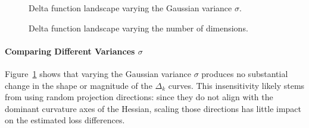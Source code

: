 \documentclass{article}
\begin{document}
\begin{figure}[!htbp]
  \hspace*{-2.6cm}
  \caption{Delta function landscape varying the Gaussian variance $\sigma$.}
  \label{fig:delta_random_sigma}
\end{figure}

\begin{figure}[!htbp]
  \hspace*{-2.6cm}
  \caption{Delta function landscape varying the number of dimensions.}
  \label{fig:delta_random_dim}
\end{figure}

\paragraph{Comparing Different Variances \texorpdfstring{$\sigma$}{sigma}}
Figure~\ref{fig:delta_random_sigma} shows that varying the Gaussian variance $\sigma$ produces no substantial change in the shape or
magnitude of the $\Delta_k$ curves. This insensitivity likely stems from using random projection directions: since they do not align
with the dominant curvature axes of the Hessian, scaling those directions has little impact on the estimated loss differences.
\end{document}
